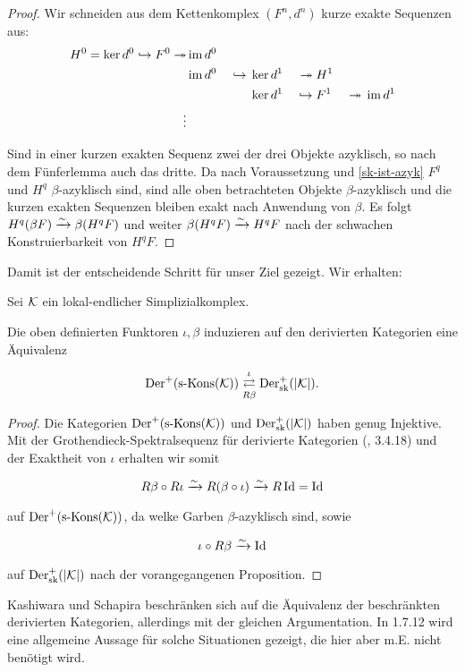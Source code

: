 \begin{proof}
  Wir schneiden aus dem Kettenkomplex $(F^n, d^n)$ kurze exakte
  Sequenzen aus:
  \begin{alignat*}{4}
    H^0 = \ker d^0 \hookrightarrow F^0 \twoheadrightarrow &\operatorname{im} d^0 & & \\
    &\operatorname{im} d^0& {} \hookrightarrow {} &\ker d^1& {}\twoheadrightarrow {} &H^1& \\
    && &\ker d^1& {} \hookrightarrow {} &F^1& {} \twoheadrightarrow {} \operatorname{im} d^1 \\
    \vdots
  \end{alignat*}
  
  Sind in einer kurzen exakten Sequenz zwei der drei Objekte
  azyklisch, so nach dem Fünferlemma auch das dritte. Da nach
  Voraussetzung und \ref{sk-ist-azyk} $F^q$ und $H^q$
  $\beta$-azyklisch sind, sind alle oben betrachteten Objekte
  $\beta$-azyklisch und die kurzen exakten Sequenzen bleiben exakt
  nach Anwendung von $\beta$. Es folgt $H^q(\beta F) \xrightarrow{\sim} \beta (H^q
  F)$ und weiter $\beta (H^q F) \xrightarrow{\sim} H^q F$ nach der schwachen
  Konstruierbarkeit von $H^q F$.
\end{proof}

Damit ist der entscheidende Schritt für unser Ziel gezeigt. Wir
erhalten:

\begin{theorem}
  Sei $\mathcal{K}$ ein lokal-endlicher Simplizialkomplex. %

  Die oben definierten Funktoren $\iota, \beta$ induzieren auf den
  derivierten Kategorien eine Äquivalenz

  \[ \operatorname{Der}^+(\operatorname{s-Kons}(\mathcal{K})) \mathrel{\mathop{\rightleftarrows}^{\iota}_{R \beta}} \operatorname{Der}^+_{\mathrm{sk}}(|\mathcal{K}|). \]
\end{theorem}
\begin{proof}
  Die Kategorien $\operatorname{Der}^+(\operatorname{s-Kons}(\mathcal{K}))$ und $\operatorname{Der}^+_{\mathrm{sk}}(|\mathcal{K}|)$ haben genug
  Injektive.  Mit der Grothendieck-Spektralsequenz für derivierte
  Kategorien (\cite{TD}, 3.4.18) und der Exaktheit von $\iota$
  erhalten wir somit

  \[ R\beta \circ R\iota \xrightarrow{\sim} R(\beta \circ \iota) \xrightarrow{\sim} R \operatorname{Id} = \operatorname{Id} \]

  auf $\operatorname{Der}^+(\operatorname{s-Kons}(\mathcal{K}))$, da welke Garben $\beta$-azyklisch sind, sowie

  \[ \iota \circ R \beta \xrightarrow{\sim} \operatorname{Id} \]

  auf $\operatorname{Der}^+_{\mathrm{sk}}(|\mathcal{K}|)$ nach der vorangegangenen Proposition.
\end{proof}
\begin{bem}
  Kashiwara und Schapira beschränken sich auf die Äquivalenz der
  beschränkten derivierten Kategorien, allerdings mit der gleichen
  Argumentation. In \cite{KS} 1.7.12 wird eine allgemeine Aussage für
  solche Situationen gezeigt, die hier aber m.E. nicht benötigt wird.
\end{bem}


